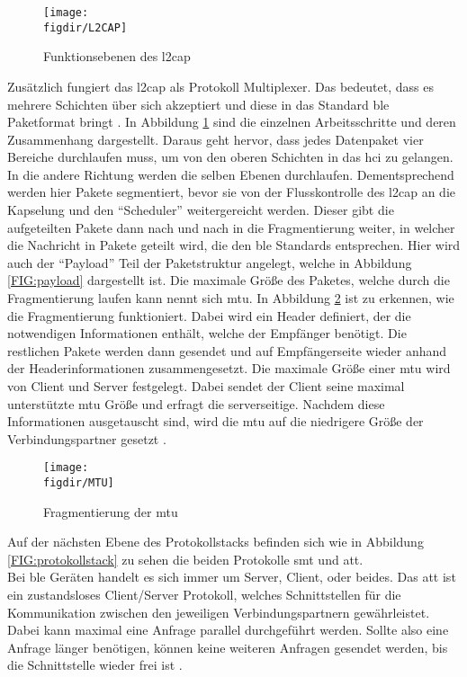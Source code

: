 \begin{figure}[h]
	\centering
	\texttt{[image: \\figdir/L2CAP]}
	\caption{Funktionsebenen des \ac{l2cap} \cite{TI:WWW}}
	\label{FIG:l2cap}
\end{figure}

\noindent Zusätzlich fungiert das \ac{l2cap} als Protokoll Multiplexer. Das bedeutet, dass es mehrere Schichten über sich akzeptiert und diese in das Standard \ac{ble} Paketformat bringt \cite[Seite 25]{Townsend14:GSB}. In Abbildung \ref{FIG:l2cap} sind die einzelnen Arbeitsschritte und deren Zusammenhang dargestellt. Daraus geht hervor, dass jedes Datenpaket vier Bereiche durchlaufen muss, um von den oberen Schichten in das \ac{hci} zu gelangen. In die andere Richtung werden die selben Ebenen durchlaufen. Dementsprechend werden hier Pakete segmentiert, bevor sie von der Flusskontrolle des \ac{l2cap} an die Kapselung und den "`Scheduler"' weitergereicht werden. Dieser gibt die aufgeteilten Pakete dann nach und nach in die Fragmentierung weiter, in welcher die Nachricht in Pakete geteilt wird, die den \ac{ble} Standards entsprechen. Hier wird auch der "`Payload"' Teil der Paketstruktur angelegt, welche in Abbildung \ref{FIG:payload} dargestellt ist. Die maximale Größe des Paketes, welche durch die Fragmentierung laufen kann nennt sich \ac{mtu}. In Abbildung \ref{FIG:mtu} ist zu erkennen, wie die Fragmentierung funktioniert. Dabei wird ein Header definiert, der die notwendigen Informationen enthält, welche der Empfänger benötigt. Die restlichen Pakete werden dann gesendet und auf Empfängerseite wieder anhand der Headerinformationen zusammengesetzt. Die maximale Größe einer \ac{mtu} wird von Client und Server festgelegt. Dabei sendet der Client seine maximal unterstützte \ac{mtu} Größe und erfragt die serverseitige. Nachdem diese Informationen ausgetauscht sind, wird die \ac{mtu} auf die niedrigere Größe der Verbindungspartner gesetzt \cite{TI:WWW}.\\ 

\begin{figure}[h]
	\centering
	\texttt{[image: \\figdir/MTU]}
	\caption{Fragmentierung der \ac{mtu} \cite{TI:WWW}}
	\label{FIG:mtu}
\end{figure}

\noindent Auf der nächsten Ebene des Protokollstacks befinden sich wie in Abbildung \ref{FIG:protokollstack} zu sehen die beiden Protokolle \ac{smt} und \ac{att}.\\

\noindent Bei \ac{ble} Geräten handelt es sich immer um Server, Client, oder beides. Das \ac{att} ist ein zustandsloses Client/Server Protokoll, welches Schnittstellen für die Kommunikation zwischen den jeweiligen Verbindungspartnern gewährleistet. Dabei kann maximal eine Anfrage parallel durchgeführt werden. Sollte also eine Anfrage länger benötigen, können keine weiteren Anfragen gesendet werden, bis die Schnittstelle wieder frei ist \cite[Seite 26]{Townsend14:GSB}.\\

